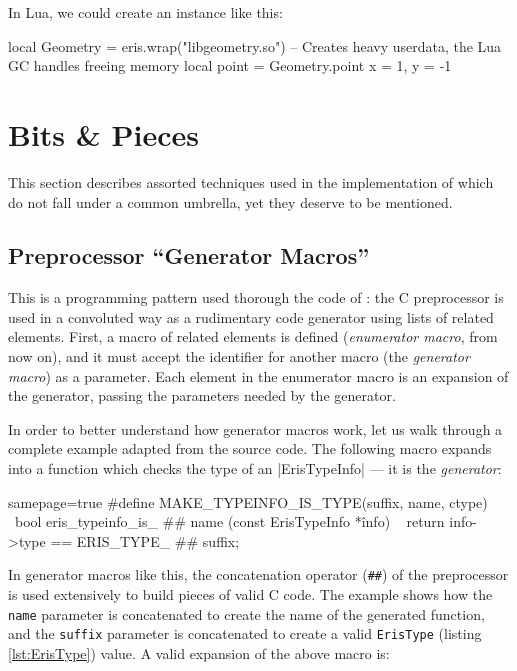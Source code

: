 In Lua, we could create an instance like this:

\begin{luacode}
local Geometry = eris.wrap("libgeometry.so")
-- Creates heavy userdata, the Lua GC handles freeing memory
local point = Geometry.point { x = 1, y = -1 }
\end{luacode}


\section{Bits \& Pieces}

This section describes assorted techniques used in the implementation of
\Eris* which do not fall under a common umbrella, yet they deserve to be
mentioned.

\subsection{Preprocessor “Generator Macros”}
  \label{sec:cpp-abuse-genmacros}

This is a programming pattern used thorough the code of \Eris*: the
C preprocessor is used in a convoluted way as a rudimentary code generator
using lists of related elements. First, a macro of related elements is defined
(\emph{enumerator macro}, from now on), and it must accept the identifier for
another macro (the \emph{generator macro}) as a parameter. Each element in the
enumerator macro is an expansion of the generator, passing the parameters
needed by the generator.

In order to better understand how generator macros work, let us walk through
a complete example adapted from the \Eris* source code. The following macro
expands into a function which checks the type of an \Mc|ErisTypeInfo| — it is
the \emph{generator}:

\begin{ccode*}{samepage=true}
#define MAKE_TYPEINFO_IS_TYPE(suffix, name, ctype)            \
    bool eris_typeinfo_is_ ## name (const ErisTypeInfo *înfo) \
    { return info->type == ERIS_TYPE_ ## suffix; }
\end{ccode*}

\noindent In generator macros like this, the concatenation operator
(\verb|##|) of the preprocessor is used extensively to build pieces of valid
C code. The example shows how the \verb|name| parameter is concatenated to
create the name of the generated function, and the \verb|suffix| parameter is
concatenated to create a valid \verb|ErisType| (listing \vref{lst:ErisType})
value. A valid expansion of the above macro is:

